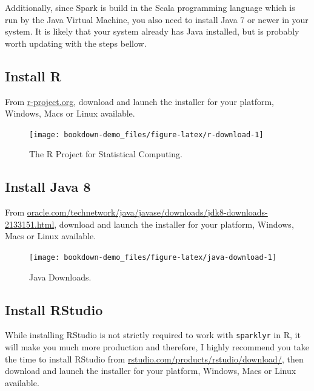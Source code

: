 \documentclass[]{book}
\theoremstyle{definition}
\theoremstyle{definition}
\theoremstyle{definition}
\theoremstyle{remark}
\begin{document}
Additionally, since Spark is build in the Scala programming language
which is run by the Java Virtual Machine, you also need to install Java
7 or newer in your system. It is likely that your system already has
Java installed, but is probably worth updating with the steps bellow.

\subsection{Install R}\label{install-r}

From \href{https://r-project.org/}{r-project.org}, download and launch
the installer for your platform, Windows, Macs or Linux available.

\begin{figure}

{\centering \texttt{[image: bookdown-demo\_files/figure-latex/r-download-1]} 

}

\caption{The R Project for Statistical Computing.}\label{fig:r-download}
\end{figure}

\subsection{Install Java 8}\label{install-java-8}

From
\href{http://www.oracle.com/technetwork/java/javase/downloads/jdk8-downloads-2133151.html}{oracle.com/technetwork/java/javase/downloads/jdk8-downloads-2133151.html},
download and launch the installer for your platform, Windows, Macs or
Linux available.

\begin{figure}

{\centering \texttt{[image: bookdown-demo\_files/figure-latex/java-download-1]} 

}

\caption{Java Downloads.}\label{fig:java-download}
\end{figure}

\subsection{Install RStudio}\label{install-rstudio}

While installing RStudio is not strictly required to work with
\texttt{sparklyr} in R, it will make you much more production and
therefore, I highly recommend you take the time to install RStudio from
\href{https://www.rstudio.com/products/rstudio/download/}{rstudio.com/products/rstudio/download/},
then download and launch the installer for your platform, Windows, Macs
or Linux available.
\end{document}
